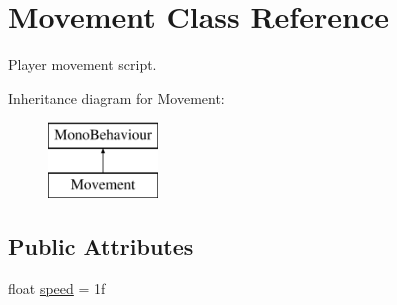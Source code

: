 \hypertarget{class_movement}{}\section{Movement Class Reference}
\label{class_movement}


Player movement script.  


Inheritance diagram for Movement\+:\begin{figure}[H]
\begin{center}
\leavevmode
\includegraphics[height=2.000000cm]{class_movement}
\end{center}
\end{figure}
\subsection*{Public Attributes}
\begin{DoxyCompactItemize}
\item 
float \mbox{\hyperlink{class_movement_aba07bc6bfeba07294bfd68dec4962388}{speed}} = 1f
\end{DoxyCompactItemize}
